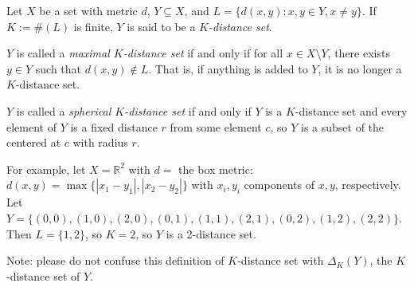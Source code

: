 \documentclass[12pt]{article}
\begin{document}
Let $X$ be a set with metric $d$, $Y\subseteq X$, and $L=\{d(x,y):x,y\in Y,x\ne y\}$. If $K:=\#(L)$ is finite, $Y$ is said to be a {\em $K$-distance set}.

$Y$ is called a {\em maximal $K$-distance set} if and only if for all $x\in X\setminus Y$, there exists $y\in Y$ such that $d(x,y)\notin L$. That is, if anything is added to $Y$, it is no longer a $K$-distance set.

$Y$ is called a {\em spherical $K$-distance set} if and only if $Y$ is a $K$-distance set and every element of $Y$ is a fixed distance $r$ from some element $c$, so $Y$ is a subset of the  centered at $c$ with radius $r$.

For example, let $X=\mathbb{R}^2$ with $d=$ the box metric: $d(x,y)=\max\{|x_1-y_1|,|x_2-y_2|\}$ with $x_i,y_i$ components of $x,y$, respectively. Let $Y=\{(0,0),(1,0),(2,0),(0,1),(1,1),(2,1),(0,2),(1,2),(2,2)\}$. Then $L=\{1,2\}$, so $K=2$, so $Y$ is a 2-distance set.


Note: please do not confuse this definition of $K$-distance set with $\Delta_K(Y)$, the $K$-distance set of $Y$.
\end{document}
